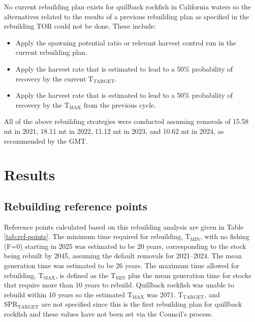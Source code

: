 \documentclass[11pt,
  letterpaper,
]{article}
\begin{document}
No current rebuilding plan exists for quillback rockfish in California waters so the alternatives related to the results of a previous rebuilding plan as specified in the rebuilding TOR could not be done. These include:

\begin{itemize}
 \item Apply the spawning potential ratio or relevant harvest control run in the current rebuilding plan. 
 \item Apply the harvest rate that is estimated to lead to a 50$\%$ probability of recovery by the current $\text{T}_\text{TARGET}$.
 \item Apply the harvest rate that is estimated to lead to a 50$\%$ probability of recovery by the $\text{T}_\text{MAX}$ from the previous cycle.
\end{itemize}

All of the above rebuilding strategies were conducted assuming removals of 15.58 mt in 2021, 18.11 mt in 2022, 11.12 mt in 2023, and 10.62 mt in 2024, as recommended by the GMT.

\hypertarget{results}{%
\section{Results}\label{results}}

\hypertarget{rebuilding-reference-points}{%
\subsection{Rebuilding reference points}\label{rebuilding-reference-points}}

Reference points calculated based on this rebuilding analysis are given in Table \ref{tab:ref-points}. The minimum time required for rebuilding, \(\text{T}_\text{MIN}\), with no fishing (F=0) starting in 2025 was estimated to be 20 years, corresponding to the stock being rebuilt by 2045, assuming the default removals for 2021--2024. The mean generation time was estimated to be 26 years. The maximum time allowed for rebuilding, \(\text{T}_\text{MAX}\), is defined as the \(\text{T}_\text{MIN}\) plus the mean generation time for stocks that require more than 10 years to rebuild. Quillback rockfish was unable to rebuild within 10 years so the estimated \(\text{T}_\text{MAX}\) was 2071. \(\text{T}_\text{TARGET}\), and \(\text{SPR}_\text{TARGET}\) are not specified since this is the first rebuilding plan for quillback rockfish and these values have not been set via the Council's process.
\end{document}
